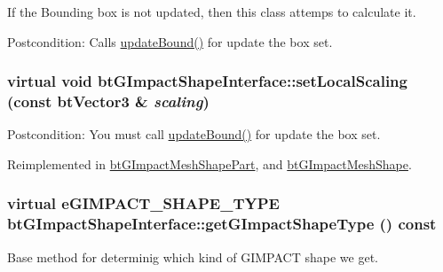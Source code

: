 If the Bounding box is not updated, then this class attemps to calculate it. 

\begin{Desc}
\item[Postcondition:]Calls \hyperlink{classbt_g_impact_shape_interface_cb26c2d7a2aecabd06b996b72b848492}{updateBound()} for update the box set. \end{Desc}
\hypertarget{classbt_g_impact_shape_interface_dec0bd43cd0105b1d0dc172bc7db50d8}{
\subsubsection[setLocalScaling]{\setlength{\rightskip}{0pt plus 5cm}virtual void btGImpactShapeInterface::setLocalScaling (const btVector3 \& {\em scaling})}}
\label{classbt_g_impact_shape_interface_dec0bd43cd0105b1d0dc172bc7db50d8}


\begin{Desc}
\item[Postcondition:]You must call \hyperlink{classbt_g_impact_shape_interface_cb26c2d7a2aecabd06b996b72b848492}{updateBound()} for update the box set. \end{Desc}


Reimplemented in \hyperlink{classbt_g_impact_mesh_shape_part_2c1de297d020a75e1ab0f10f7c71478f}{btGImpactMeshShapePart}, and \hyperlink{classbt_g_impact_mesh_shape_ed8d5e4b2e75538109909d44b244bc35}{btGImpactMeshShape}.\hypertarget{classbt_g_impact_shape_interface_25cacbe448997e3f8ec99cb2d4952859}{
\subsubsection[getGImpactShapeType]{\setlength{\rightskip}{0pt plus 5cm}virtual eGIMPACT\_\-SHAPE\_\-TYPE btGImpactShapeInterface::getGImpactShapeType () const}}
\label{classbt_g_impact_shape_interface_25cacbe448997e3f8ec99cb2d4952859}


Base method for determinig which kind of GIMPACT shape we get. 

